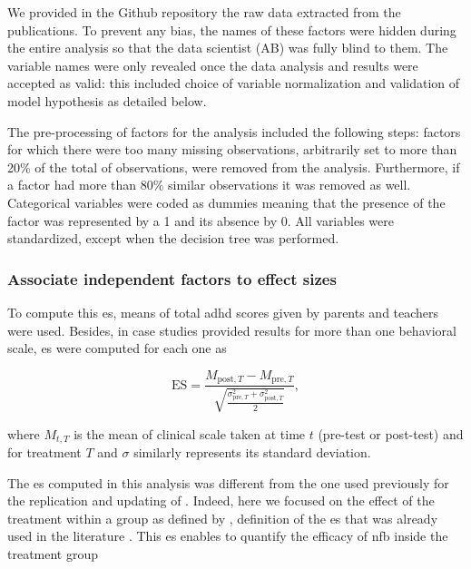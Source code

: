 We provided in the Github repository \citep{Bussalb2018} the raw data extracted from the publications. To prevent any bias, the names of these factors
were hidden during the entire analysis so that the data scientist (AB) was fully blind to them. The variable names were only revealed once the data 
analysis and results were accepted as valid: this included choice of variable normalization and validation of model hypothesis as detailed below.

The pre-processing of factors for the analysis included the following steps: factors for which there were too many missing observations, 
arbitrarily set to more than 20\% of the total of observations, were removed from the analysis. Furthermore, if a factor had more than 
80\% similar observations it was removed as well. Categorical variables were coded as dummies meaning that the presence of the factor was represented by a 1 
and its absence by 0. All variables were standardized, except when the decision tree was performed. 

\subsubsection{Associate independent factors to effect sizes}

To compute this \gls{es}, means of total \gls{adhd} scores given by parents and teachers were used. Besides, in case studies provided results 
for more than one behavioral scale, \gls{es} were computed for each one as 

\begin{equation*}
\label{eq:factors_effect_size_within_subject}
\text{ES} = \frac{M_{\text{post},T} - M_{\text{pre},T}}{\sqrt{\frac{\sigma_{\text{pre},T}^2 + \sigma_{\text{post},T}^2}{2}}},
\end{equation*} 

where $M_{t,T}$ is the mean of clinical scale taken at time $t$ (pre-test or post-test) and for treatment $T$ and $\sigma$ similarly represents its standard deviation.

The \gls{es} computed in this analysis was different from the one 
used previously for the replication and updating of \citet{Cortese2016}. Indeed, here we focused on the effect of the treatment within 
a group as defined by \citet{Cohen1988}, definition of the \gls{es} that was already used in the literature \citep{Arns2009, Maurizio2014, 
Strehl2017}. This \gls{es} enables to quantify the efficacy of \gls{nfb} inside the treatment group 

